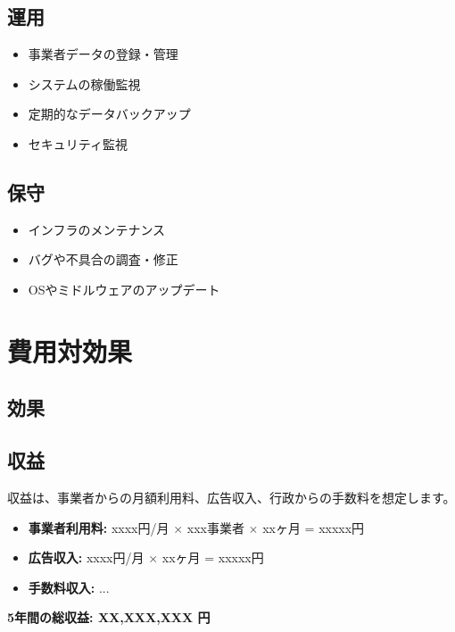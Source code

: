 \documentclass[a4j, 11pt, report]{jsarticle}
\begin{document}
\subsection{運用}
\begin{itemize}
    \item 事業者データの登録・管理
    \item システムの稼働監視
    \item 定期的なデータバックアップ
    \item セキュリティ監視
\end{itemize}

\subsection{保守}
\begin{itemize}
    \item インフラのメンテナンス
    \item バグや不具合の調査・修正
    \item OSやミドルウェアのアップデート
\end{itemize}

\section{費用対効果}
\subsection{効果}


\subsection{収益}
収益は、事業者からの月額利用料、広告収入、行政からの手数料を想定します。
\begin{itemize}
    \item \textbf{事業者利用料:} xxxx円/月 $\times$ xxx事業者 $\times$ xxヶ月 = xxxxx円
    \item \textbf{広告収入:} xxxx円/月 $\times$ xxヶ月 = xxxxx円
    \item \textbf{手数料収入:} ...
\end{itemize}
\textbf{5年間の総収益: XX,XXX,XXX 円}
\end{document}
